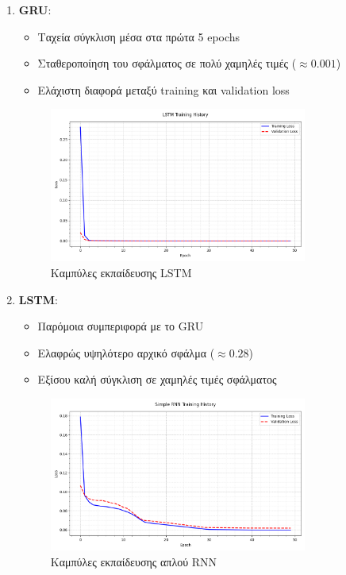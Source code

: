 \documentclass[a4paper,12pt]{article}
\begin{document}
\begin{enumerate}
    \item \textbf{GRU}:
          \begin{itemize}
              \item Ταχεία σύγκλιση μέσα στα πρώτα 5 epochs
              \item Σταθεροποίηση του σφάλματος σε πολύ χαμηλές τιμές ($\approx 0.001$)
              \item Ελάχιστη διαφορά μεταξύ training και validation loss
          \end{itemize}

          \begin{figure}[h]
              \centering
              \includegraphics[width=0.8\textwidth]{lstm_loss.png}
              \caption{Καμπύλες εκπαίδευσης LSTM}
              \label{fig:lstm_history}
          \end{figure}

    \item \textbf{LSTM}:
          \begin{itemize}
              \item Παρόμοια συμπεριφορά με το GRU
              \item Ελαφρώς υψηλότερο αρχικό σφάλμα ($\approx 0.28$)
              \item Εξίσου καλή σύγκλιση σε χαμηλές τιμές σφάλματος
          \end{itemize}

          \begin{figure}[h]
              \centering
              \includegraphics[width=0.8\textwidth]{simple_rnn_loss.png}
              \caption{Καμπύλες εκπαίδευσης απλού RNN}
              \label{fig:rnn_history}
          \end{figure}


\end{enumerate}
\end{document}
